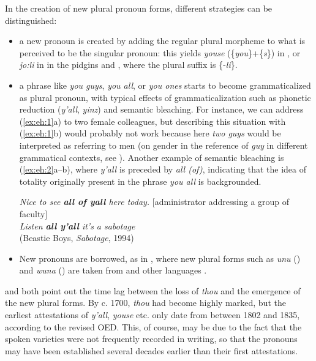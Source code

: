 \documentclass[output=paper,hidelinks]{langscibook}
\begin{document}
In the creation of new plural pronoun forms, different strategies can be distinguished:
\begin{itemize}
	\item a new pronoun is created by adding the regular plural morpheme to what is perceived to be the singular pronoun: this yields \textit{youse} (\{\textit{you}\}+\{\textit{s}\}) in , or \textit{jo:li} in \citet[363]{Hickey2003} in the pidgins  and , where the plural suffix is \{-\textit{li}\}.
	\item a phrase like \textit{you guys}, \textit{you all}, or \textit{you ones} starts to become grammaticalized as plural pronoun, with typical effects of grammaticalization such as phonetic reduction (\textit{y'all}, \textit{yinz}) and semantic bleaching. For instance, we can address (\ref{ex:eh:1}a) to two female colleagues, but describing this situation with (\ref{ex:eh:1}b) would probably not work because here \textit{two guys} would be interpreted as referring to men (on gender in the reference of \textit{guy} in different grammatical contexts, see \citealt{McLennan2004}). Another example of semantic bleaching is (\ref{ex:eh:2}a–b), where \textit{y'all} is preceded by \textit{all (of)}, indicating that the idea of totality originally present in the phrase \textit{you all} is backgrounded.
	\ea
		\begin{xlist} \label{ex:eh:1}
		\end{xlist}
	\ex
		\begin{xlist} \label{ex:eh:2}
		\ex \textit{Nice to see \textbf{all of yall} here today.} [administrator addressing a group of faculty] \\
		\citep[from][291]{Tillery2000}
		\ex \textit{Listen \textbf{all y'all} it's a sabotage}\\
			(Beastie Boys, \textit{Sabotage}, 1994)
		\end{xlist}
	\z
	\item New pronouns are borrowed, as in , where new plural forms such as \textit{unu} () and \textit{wuna} () are taken from  and other  languages \citep[360]{Hickey2003}.
\end{itemize}

\citet[357-358]{Hickey2003} and \citet[181--182]{Wright1997} both point out the time lag between the loss of \textit{thou} and the emergence of the new plural forms. By c. 1700, \textit{thou} had become highly marked, but the earliest attestations of \textit{y’all}, \textit{youse} etc. only date from between 1802 and 1835, according to the revised OED. This, of course, may be due to the fact that the spoken varieties were not frequently recorded in writing, so that the pronouns may have been established several decades earlier than their first attestations.
 
\end{document}
